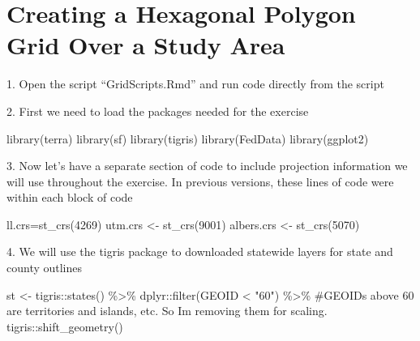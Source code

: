 \documentclass[
  letterpaper,
]{book}
\newenvironment{Shaded}{\begin{snugshade}}{\end{snugshade}}
\newcommand{\CommentTok}[1]{\textcolor[rgb]{0.37,0.37,0.37}{#1}}
\newcommand{\DecValTok}[1]{\textcolor[rgb]{0.68,0.00,0.00}{#1}}
\newcommand{\FunctionTok}[1]{\textcolor[rgb]{0.28,0.35,0.67}{#1}}
\newcommand{\NormalTok}[1]{\textcolor[rgb]{0.00,0.23,0.31}{#1}}
\newcommand{\OtherTok}[1]{\textcolor[rgb]{0.00,0.23,0.31}{#1}}
\newcommand{\SpecialCharTok}[1]{\textcolor[rgb]{0.37,0.37,0.37}{#1}}
\newcommand{\StringTok}[1]{\textcolor[rgb]{0.13,0.47,0.30}{#1}}
\begin{document}
\hypertarget{creating-a-hexagonal-polygon-grid-over-a-study-area}{%
\chapter{Creating a Hexagonal Polygon Grid Over a Study
Area}\label{creating-a-hexagonal-polygon-grid-over-a-study-area}}

1. Open the script ``GridScripts.Rmd'' and run code directly from the
script

2. First we need to load the packages needed for the exercise

\begin{Shaded}
\begin{Highlighting}[]
\FunctionTok{library}\NormalTok{(terra)}
\FunctionTok{library}\NormalTok{(sf)}
\FunctionTok{library}\NormalTok{(tigris)}
\FunctionTok{library}\NormalTok{(FedData)}
\FunctionTok{library}\NormalTok{(ggplot2)}
\end{Highlighting}
\end{Shaded}

3. Now let's have a separate section of code to include projection
information we will use throughout the exercise. In previous versions,
these lines of code were within each block of code

\begin{Shaded}
\begin{Highlighting}[]
\NormalTok{ll.crs}\OtherTok{=}\FunctionTok{st\_crs}\NormalTok{(}\DecValTok{4269}\NormalTok{)}
\NormalTok{utm.crs }\OtherTok{\textless{}{-}} \FunctionTok{st\_crs}\NormalTok{(}\DecValTok{9001}\NormalTok{)}
\NormalTok{albers.crs }\OtherTok{\textless{}{-}} \FunctionTok{st\_crs}\NormalTok{(}\DecValTok{5070}\NormalTok{)}
\end{Highlighting}
\end{Shaded}

4. We will use the tigris package to downloaded statewide layers for
state and county outlines

\begin{Shaded}
\begin{Highlighting}[]
\NormalTok{st }\OtherTok{\textless{}{-}}\NormalTok{ tigris}\SpecialCharTok{::}\FunctionTok{states}\NormalTok{() }\SpecialCharTok{\%\textgreater{}\%}
\NormalTok{  dplyr}\SpecialCharTok{::}\FunctionTok{filter}\NormalTok{(GEOID }\SpecialCharTok{\textless{}} \StringTok{"60"}\NormalTok{) }\SpecialCharTok{\%\textgreater{}\%} \CommentTok{\#GEOID\textquotesingle{}s above 60 are territories and islands, etc. So I\textquotesingle{}m removing them for scaling.}
\NormalTok{  tigris}\SpecialCharTok{::}\FunctionTok{shift\_geometry}\NormalTok{()}
\end{Highlighting}
\end{Shaded}
\end{document}
